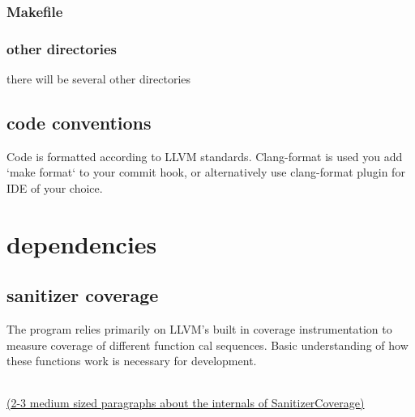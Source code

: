 \documentclass{elteikthesis}[2018/06/06]
\begin{document}
\subsubsection{Makefile}
\label{sec-3-1-1-6}

\subsubsection{other directories}
\label{sec-3-1-1-7}
there will be several other directories \\
\subsection{code conventions}
\label{sec-3-1-2}
Code is formatted according to LLVM standards. Clang-format is used  you add `make format` to your commit hook, or alternatively use clang-format plugin for IDE of your choice. \\
\section{dependencies}
\label{sec-3-2}
\subsection{sanitizer coverage}
\label{sec-3-2-1}
The program relies primarily on LLVM's built in coverage instrumentation to measure coverage of different function cal sequences. Basic understanding of how these functions work is necessary for development. \\

\begin{center}
\begin{tabular}{}
\\
\\
\end{tabular}
\end{center}
\uline{(2-3 medium sized paragraphs about the internals of SanitizerCoverage)} \\
\begin{center}
\begin{tabular}{}
\\
\\
\\
\\
\\
\\
\\
\\
\end{tabular}
\end{center}
\end{document}
